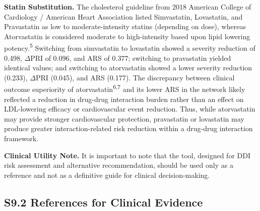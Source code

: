 \documentclass[12pt,a4paper]{article}
\begin{document}
\textbf{Statin Substitution.} The cholesterol guideline from 2018 American College of Cardiology / American Heart Association listed Simvastatin, Lovastatin, and Pravastatin as low to moderate-intensity statins (depending on dose), whereas Atorvastatin is considered moderate to high-intensity based upon lipid lowering potency.\textsuperscript{5} Switching from simvastatin to lovastatin showed a severity reduction of 0.498, $\Delta$PRI of 0.096, and ARS of 0.377; switching to pravastatin yielded identical values; and switching to atorvastatin showed a lower severity reduction (0.233), $\Delta$PRI (0.045), and ARS (0.177). The discrepancy between clinical outcome superiority of atorvastatin\textsuperscript{6,7} and its lower ARS in the network likely reflected a reduction in drug-drug interaction burden rather than an effect on LDL-lowering efficacy or cardiovascular event reduction. Thus, while atorvastatin may provide stronger cardiovascular protection, pravastatin or lovastatin may produce greater interaction-related risk reduction within a drug-drug interaction framework.

\textbf{Clinical Utility Note.} It is important to note that the tool, designed for DDI risk assessment and alternative recommendation, should be used only as a reference and not as a definitive guide for clinical decision-making.

\subsection{S9.2 References for Clinical Evidence}
\end{document}
